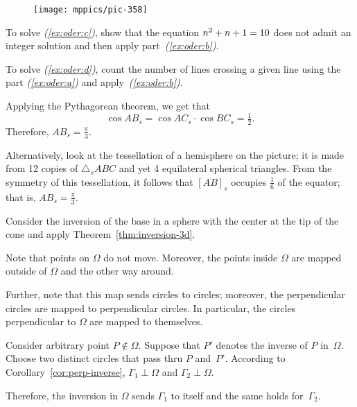 {

\begin{wrapfigure}[12]{r}{43mm}
\vskip-0mm
\centering
\texttt{[image: mppics/pic-358]}
\end{wrapfigure}

To solve \textit{(\ref{ex:oder:c})}, show that the equation
$n^2+n+1\z=10$ 
does not admit an integer solution and then apply part~\textit{(\ref{ex:oder:b})}.


To solve \textit{(\ref{ex:oder:d})}, count the number of lines crossing a given line using the 
part \textit{(\ref{ex:oder:a})} and apply~\textit{(\ref{ex:oder:b})}.

\setcounter{eqtn}{0}


Applying the Pythagorean theorem, we get that
$$
\cos AB_s=\cos AC_s\cdot\cos BC_s=\tfrac12.
$$
Therefore, $AB_s=\tfrac\pi3$.

Alternatively, 
look at the tessellation of a hemisphere on the picture; 
it is made from 12 copies of $\triangle_s A B C$ and yet 4 equilateral spherical triangles.
From the symmetry of this tessellation, it follows that $[AB]_s$ occupies $\tfrac16$ of the equator; that is, $AB_s=\tfrac\pi3$.

Consider the inversion of the base in a sphere with the center at the tip of the cone and apply Theorem~\ref{thm:inversion-3d}.

Note that points on $\Omega$ do not move.
Moreover, the points inside $\Omega$ 
are mapped outside of $\Omega$ and the other way around.

}

Further, note that this map sends circles to circles;
moreover, the perpendicular circles are mapped to perpendicular circles.
In particular, the circles perpendicular to $\Omega$ are mapped to themselves.

Consider arbitrary point $P\notin\Omega$.
Suppose that $P'$ denotes the inverse of $P$ in~$\Omega$.
Choose two distinct circles that pass thru $P$ and~$P'$.
According to Corollary~\ref{cor:perp-inverse}, 
$\Gamma_1\perp \Omega$ and $\Gamma_2\perp \Omega$.

Therefore, the inversion in $\Omega$ sends $\Gamma_1$ to itself and the same holds for~$\Gamma_2$. 

